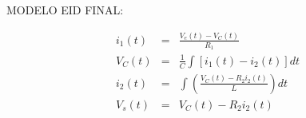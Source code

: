 \documentclass{article}
\begin{document}
MODELO EID FINAL:

\begin{eqnarray*}
i_{1}(t) &=&\frac{V_{e}(t)-V_{C}(t)}{R_{1}} \\
V_{C}(t) &=&\frac{1}{C}\int [i_{1}(t)-i_{2}(t)]dt \\
i_{2}(t) &=&\int \left( \frac{V_{C}(t)-R_{2}i_{2}(t)}{L}\right) dt \\
V_{s}(t) &=&V_{C}(t)-R_{2}i_{2}(t)
\end{eqnarray*}

\bigskip 

\bigskip 

\bigskip 

\bigskip 

\bigskip 
\end{document}
